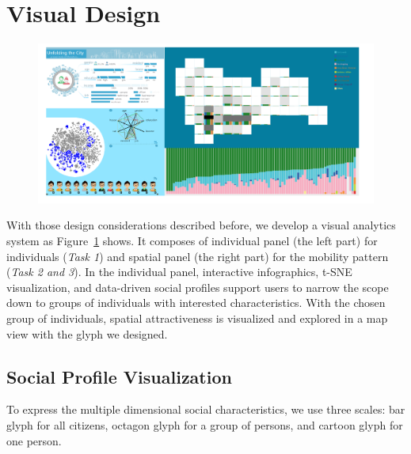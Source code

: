 \section{Visual Design}
\begin{figure}[htb!]
 \centering 
 \includegraphics[width=\linewidth]{pictures/interface53}
 \caption{}
 \label{fig:interfaceDraft}
\end{figure}

With those design considerations described before, we develop a visual analytics system as Figure~\ref{fig:interfaceDraft} shows. It composes of individual panel (the left part) for individuals (\textit{Task 1}) and spatial panel (the right part) for the mobility pattern (\textit{Task 2 and 3}). In the individual panel, interactive infographics, t-SNE visualization, and data-driven social profiles support users to narrow the scope down to groups of individuals with interested characteristics. With the chosen group of individuals, spatial attractiveness is visualized and explored in a map view with the  glyph we designed. 

\subsection{Social Profile Visualization}
To express the multiple dimensional social characteristics, we use three scales: bar glyph for all citizens, octagon glyph for a group of persons, and cartoon glyph for one person.

